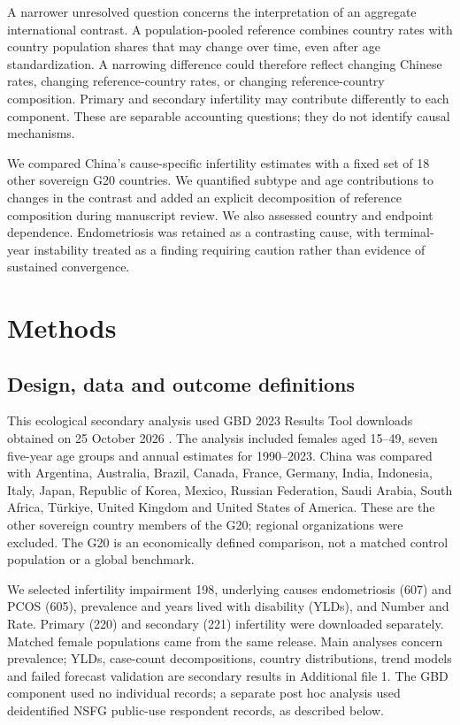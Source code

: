 \documentclass[11pt,a4paper]{article}
\begin{document}
A narrower unresolved question concerns the interpretation of an aggregate international contrast. A population-pooled reference combines country rates with country population shares that may change over time, even after age standardization. A narrowing difference could therefore reflect changing Chinese rates, changing reference-country rates, or changing reference-country composition. Primary and secondary infertility may contribute differently to each component. These are separable accounting questions; they do not identify causal mechanisms.

We compared China's cause-specific infertility estimates with a fixed set of 18 other sovereign G20 countries. We quantified subtype and age contributions to changes in the contrast and added an explicit decomposition of reference composition during manuscript review. We also assessed country and endpoint dependence. Endometriosis was retained as a contrasting cause, with terminal-year instability treated as a finding requiring caution rather than evidence of sustained convergence.

\section{Methods}
\subsection{Design, data and outcome definitions}
This ecological secondary analysis used GBD 2023 Results Tool downloads obtained on 25 October 2026 \cite{results}. The analysis included females aged 15--49, seven five-year age groups and annual estimates for 1990--2023. China was compared with Argentina, Australia, Brazil, Canada, France, Germany, India, Indonesia, Italy, Japan, Republic of Korea, Mexico, Russian Federation, Saudi Arabia, South Africa, T\"urkiye, United Kingdom and United States of America. These are the other sovereign country members of the G20; regional organizations were excluded. The G20 is an economically defined comparison, not a matched control population or a global benchmark.

We selected infertility impairment 198, underlying causes endometriosis (607) and PCOS (605), prevalence and years lived with disability (YLDs), and Number and Rate. Primary (220) and secondary (221) infertility were downloaded separately. Matched female populations came from the same release. Main analyses concern prevalence; YLDs, case-count decompositions, country distributions, trend models and failed forecast validation are secondary results in Additional file 1. The GBD component used no individual records; a separate post hoc analysis used deidentified NSFG public-use respondent records, as described below.
\end{document}
